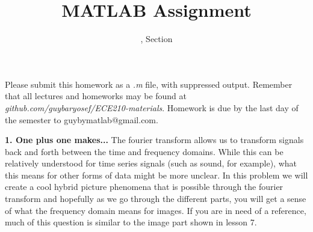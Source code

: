 \documentclass[11pt]{article}
\title{MATLAB Assignment \Homework}
\author{\Session, Section \Section}
\date{}
\makeatletter
\def\MyEmail{guybymatlab@gmail.com}
\makeatother
\begin{document}
\maketitle
Please submit this homework as a \textit{.m} file, 
with suppressed output.
Remember that all lectures and homeworks may be found at 
\textit{github.com/guybaryosef/ECE210-materials}.
Homework is due by the last day of the semester to \MyEmail.


\noindent
\newline
\textbf{1. One plus one makes...}
The fourier transform allows us to transform signals back and 
forth between the time and frequency domains.
While this can be relatively understood for time series signals
(such as sound, for example), what this means for other forms
of data might be more unclear.
In this problem we will create a cool hybrid picture phenomena that
is possible through the fourier transform and hopefully as we go 
through the different parts, you will get a sense of what the frequency
domain means for images.
If you are in need of a reference,
much of this question is similar to the image part shown in lesson 7.
\end{document}
